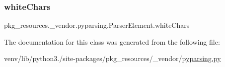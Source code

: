 \subsubsection{\texorpdfstring{white\+Chars}{whiteChars}}
{\footnotesize\ttfamily pkg\+\_\+resources.\+\_\+vendor.\+pyparsing.\+Parser\+Element.\+white\+Chars}



The documentation for this class was generated from the following file\+:\begin{DoxyCompactItemize}
\item 
venv/lib/python3./site-\/packages/pkg\+\_\+resources/\+\_\+vendor/\hyperlink{pkg__resources_2__vendor_2pyparsing_8py}{pyparsing.\+py}\end{DoxyCompactItemize}
